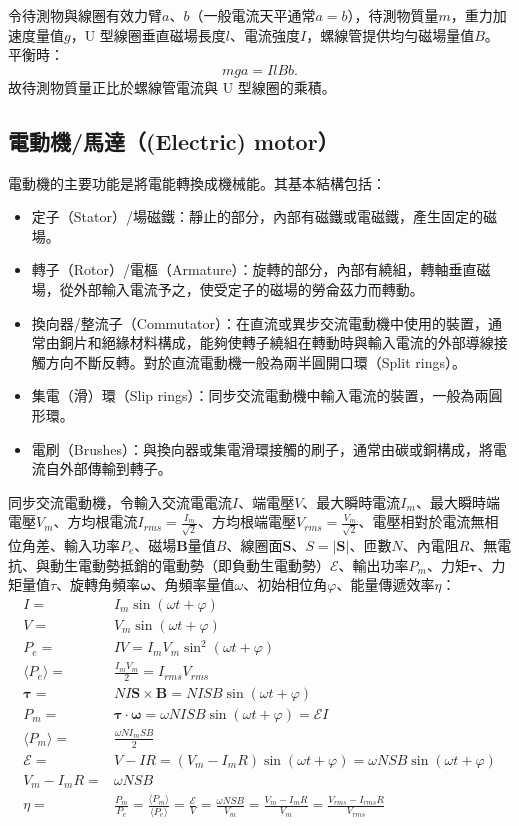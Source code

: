 \documentclass[a4paper,12pt]{report}
\begin{document}
\begin{itemize}
令待測物與線圈有效力臂$a$、$b$（一般電流天平通常$a=b$），待測物質量$m$，重力加速度量值$g$，U 型線圈垂直磁場長度$l$、電流強度$I$，螺線管提供均勻磁場量值$B$。平衡時：
\[mga=IlBb.\]
故待測物質量正比於螺線管電流與 U 型線圈的乘積。
\subsection{電動機/馬達（(Electric) motor）}
電動機的主要功能是將電能轉換成機械能。其基本結構包括：
\begin{itemize}
\item 定子（Stator）/場磁鐵：靜止的部分，內部有磁鐵或電磁鐵，產生固定的磁場。
\item 轉子（Rotor）/電樞（Armature）：旋轉的部分，內部有繞組，轉軸垂直磁場，從外部輸入電流予之，使受定子的磁場的勞侖茲力而轉動。
\item 換向器/整流子（Commutator）：在直流或異步交流電動機中使用的裝置，通常由銅片和絕緣材料構成，能夠使轉子繞組在轉動時與輸入電流的外部導線接觸方向不斷反轉。對於直流電動機一般為兩半圓開口環（Split rings）。
\item 集電（滑）環（Slip rings）：同步交流電動機中輸入電流的裝置，一般為兩圓形環。
\item 電刷（Brushes）：與換向器或集電滑環接觸的刷子，通常由碳或銅構成，將電流自外部傳輸到轉子。
\end{itemize}
同步交流電動機，令輸入交流電電流$I$、端電壓$V$、最大瞬時電流$I_m$、最大瞬時端電壓$V_m$、方均根電流$I_{rms}=\frac{I_m}{\sqrt{2}}$、方均根端電壓$V_{rms}=\frac{V_m}{\sqrt{2}}$、電壓相對於電流無相位角差、輸入功率$P_e$、磁場$\mathbf{B}$量值$B$、線圈面$\mathbf{S}$、$S=|\mathbf{S}|$、匝數$N$、內電阻$R$、無電抗、與動生電動勢抵銷的電動勢（即負動生電動勢）$\mathcal{E}$、輸出功率$P_m$、力矩$\boldsymbol{\tau}$、力矩量值$\tau$、旋轉角頻率$\boldsymbol{\omega}$、角頻率量值$\omega$、初始相位角$\varphi$、能量傳遞效率$\eta$：
\[\begin{aligned}
I=&I_m\sin(\omega t+\varphi)\\
V=&V_m\sin(\omega t+\varphi)\\
P_e=&IV=I_mV_m\sin^2(\omega t+\varphi)\\
\langle P_e\rangle=&\frac{I_mV_m}{2}=I_{rms}V_{rms}\\
\boldsymbol{\tau}=&NI\mathbf{S}\times\mathbf{B}=NISB\sin(\omega t+\varphi)\\
P_m=&\boldsymbol{\tau}\cdot\boldsymbol{\omega}=\omega NISB\sin(\omega t+\varphi)=\mathcal{E}I\\
\langle P_m\rangle=&\frac{\omega NI_mSB}{2}\\
\mathcal{E}=&V-IR=(V_m-I_mR)\sin(\omega t+\varphi)=\omega NSB\sin(\omega t+\varphi)\\
V_m-I_mR=&\omega NSB\\
\eta=&\frac{P_m}{P_e}=\frac{\langle P_m\rangle}{\langle P_e\rangle}=\frac{\mathcal{E}}{V}=\frac{\omega NSB}{V_m}=\frac{V_m-I_mR}{V_m}=\frac{V_{rms}-I_{rms}R}{V_{rms}}
\end{aligned}\]



\end{itemize}
\end{document}
